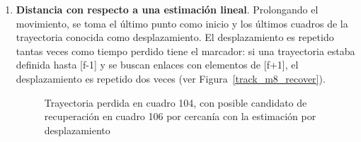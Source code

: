 \begin{itemize}
\begin{enumerate}
  \item \textbf{Distancia con respecto a una estimación lineal}. Prolongando el movimiento, se toma el último punto como inicio y los últimos cuadros de la trayectoria conocida como desplazamiento. El desplazamiento es repetido tantas veces como tiempo perdido tiene el marcador: si una trayectoria estaba definida hasta [f-1] y se buscan enlaces con elementos de [f+1], el desplazamiento es repetido dos veces (ver Figura~\ref{track_m8_recover}). 
 
\begin{figure}[ht!]
 \centering
  \hspace{3 mm}
	
\caption{Trayectoria perdida en cuadro 104, con posible candidato de recuperación en cuadro 106 por cercanía con la estimación por desplazamiento}
\label{inventario_trayectoria_direccional}
\end{figure} 
  

\end{enumerate}
\end{itemize}
